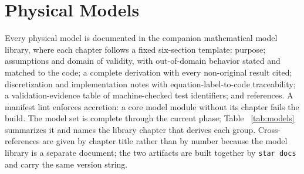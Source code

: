 \documentclass[10pt]{article}
\begin{document}
\section{Physical Models}
\label{sec:models}

Every physical model is documented in the companion mathematical model library,
where each chapter follows a fixed six-section template: purpose; assumptions
and domain of validity, with out-of-domain behavior stated and matched to the
code; a complete derivation with every non-original result cited; discretization
and implementation notes with equation-label-to-code traceability; a
validation-evidence table of machine-checked test identifiers; and references.
A manifest lint enforces accretion: a core model module without its chapter
fails the build. The model set is complete through the current phase; Table~%
\ref{tab:models} summarizes it and names the library chapter that derives each
group. Cross-references are given by chapter title rather than by number because
the model library is a separate document; the two artifacts are built together
by \texttt{star docs} and carry the same version string.
\end{document}
